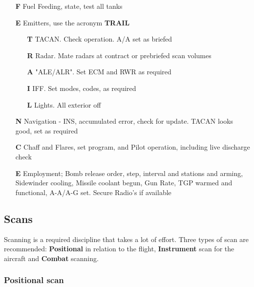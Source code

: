 \begin{enumerate}[
  align=parleft,
  itemsep=-0.25em,
  labelsep=0.25cm,
  leftmargin=*
]

  \item[\textbf{F}] Fuel Feeding, state, test all tanks
  \item[\textbf{E}] Emitters, use the acronym \textbf{TRAIL}

  \begin{enumerate}[
    align=parleft,
    itemsep=-0.25em,
    labelsep=0.25cm,
    leftmargin=*
  ]
    \setlength\parskip{0.3em}

    \item[\textbf{T}] TACAN. Check operation. A/A set as briefed
    \item[\textbf{R}] Radar. Mate radars at contract or prebriefed scan volumes
    \item[\textbf{A}] "ALE/ALR". Set ECM and RWR as required
    \item[\textbf{I}] IFF. Set modes, codes, as required
    \item[\textbf{L}] Lights. All exterior off
  \end{enumerate}

  \item[\textbf{N}] Navigation - INS, accumulated error, check for update.
    TACAN looks good, set as required

  \item[\textbf{C}] Chaff and Flares, set program, and Pilot operation,
    including live discharge check

  \item[\textbf{E}] Employment; Bomb release order, step, interval and stations
    and arming, Sidewinder cooling, Missile coolant begun, Gun Rate, TGP warmed
    and functional, A-A/A-G set. Secure Radio's if available

\end{enumerate}

\subsection{Scans}

Scanning is a required discipline that takes a lot of effort. Three types of
scan are recommended: \textbf{Positional} in relation to the flight,
\textbf{Instrument} scan for the aircraft and \textbf{Combat} scanning.

\subsubsection{Positional scan}


